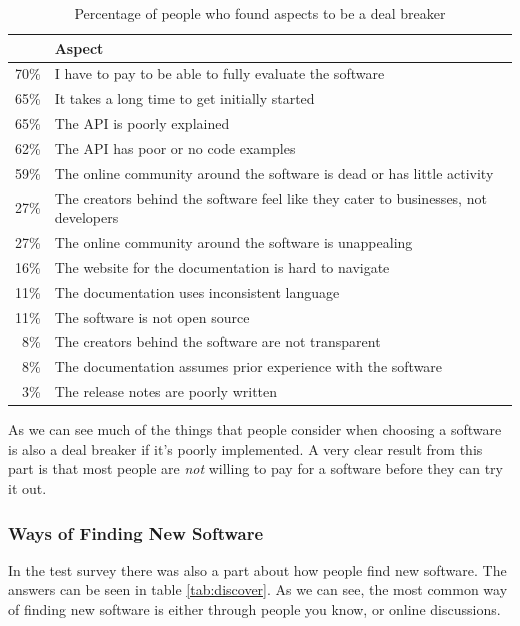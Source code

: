 \documentclass{article}
\begin{document}
\begin{table}[h]
\centering
\begin{tabularx}{\columnwidth}{r X}
& \textbf{Aspect}	\\ \hline
70\%	&	I have to pay to be able to fully evaluate the software	\\
65\%	&	It takes a long time to get initially started	\\
65\%	&	The API is poorly explained	\\
62\%	&	The API has poor or no code examples	\\
59\%	&	The online community around the software is dead or has little activity	\\
27\%	&	The creators behind the software feel like they cater to businesses, not developers	\\
27\%	&	The online community around the software is unappealing	\\
16\%	&	The website for the documentation is hard to navigate	\\
11\%	&	The documentation uses inconsistent language	\\
11\%	&	The software is not open source	\\
8\%	&	The creators behind the software are not transparent	\\
8\%	&	The documentation assumes prior experience with the software	\\
3\%	&	The release notes are poorly written	\\ \hline
\end{tabularx}
\caption{Percentage of people who found aspects to be a deal breaker}
\label{tab:dealbreaker}
\end{table}

As we can see much of the things that people consider when choosing a software is also a deal breaker if it's poorly implemented. A very clear result from this part is that most people are \textit{not} willing to pay for a software before they can try it out.

\subsubsection{Ways of Finding New Software}
In the test survey there was also a part about how people find new software. The answers can be seen in table \ref{tab:discover}. As we can see, the most common way of finding new software is either through people you know, or online discussions.
\end{document}
